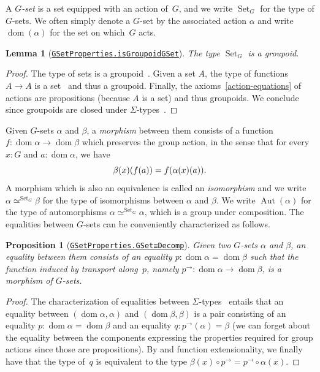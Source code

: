 \documentclass[10pt,a4paper]{amsart}
\newtheorem{proposition}[theorem]{Proposition}
\newtheorem{lemma}[theorem]{Lemma}
\theoremstyle{definition}
\newcommand{\dom}{\operatorname{dom}} %
\newcommand{\transport}[1]{#1^\to} %
\newcommand{\Aut}{\operatorname{Aut}} %
\newcommand{\Set}{\operatorname{Set}} %
\newcommand{\GSet}[1][G]{\Set_{#1}} %
\newcommand{\GSetEquiv}[3][G]{#2\simeq^{\GSet[#1]}#3} %
\newcommand{\agda}[2]{\href{https://smimram.github.io/generated-deloopings-agda/#1.html\##2}{\texttt{#1.#2}}}
\begin{document}
A \emph{$G$-set} is a set equipped with an action of~$G$, and we write $\GSet$
for the type of $G$-sets. We often simply denote a $G$-set by the associated
action $\alpha$ and write $\dom(\alpha)$ for the set on which~$G$ acts.

\begin{lemma}[\agda{GSetProperties}{isGroupoidGSet}]
  \label{gset-groupoid}
  The type $\GSet$ is a groupoid.
\end{lemma}
\begin{proof}
  The type of sets is a groupoid~\cite[Theorem 7.1.11]{hottbook}. Given a set
  $A$, the type of functions $A\to A$ is a set~\cite[Theorem 7.1.9]{hottbook}
  and thus a groupoid. Finally,
  the axioms~\cref{action-equations} of actions are propositions (because $A$
  is a set) and thus groupoids. We conclude since groupoids are closed under
  $\Sigma$-types~\cite[Theorem 7.1.8]{hottbook}.
\end{proof}

Given $G$-sets $\alpha$ and $\beta$, a \emph{morphism} between them consists of
a function $f:\dom{\alpha}\to \dom{\beta}$ which preserves the group action, in
the sense that for every $x:G$ and $a:\dom{\alpha}$, we have
\begin{equation}
  \label{G-set-morphism}
  \beta(x)(f(a))=f(\alpha(x)(a))
  \text.
\end{equation}
A morphism which is also an equivalence is called an \emph{isomorphism} and we
write $\GSetEquiv\alpha\beta$ for the type of isomorphisms between $\alpha$ and
$\beta$. We write $\Aut(\alpha)$ for the type of automorphisms
$\GSetEquiv\alpha\alpha$, which is a group under composition.
%
The equalities between $G$-sets can be conveniently characterized as follows.

\begin{proposition}[\agda{GSetProperties}{GSet≡Decomp}]
  \label{Gset-equalities}
  Given two $G$-sets $\alpha$ and $\beta$, an equality between them consists of
  an equality $p:\dom{\alpha}=\dom{\beta}$ such that the function induced by
  transport along~$p$, namely $\transport p:\dom\alpha\to\dom\beta$, is a
  morphism of $G$-sets.
\end{proposition}
\begin{proof}
  The characterization of equalities between
  $\Sigma$-types~\cite[Theorem~2.7.2]{hottbook} entails that an equality between
  $(\dom{\alpha},\alpha)$ and $(\dom{\beta},\beta)$ is a pair consisting of an
  equality $p:\dom{\alpha}=\dom{\beta}$ and an equality $q:\transport{p}(\alpha)=\beta$ (we can forget
  about the equality between the components expressing the properties required
  for group actions since those are propositions). By
  \cite[Lemma~2.9.6]{hottbook} and function extensionality, we finally have that
  the type of~$q$ is equivalent to the type
  $\beta(x)\circ\transport p=\transport p\circ\alpha(x)$.
\end{proof}
\end{document}
